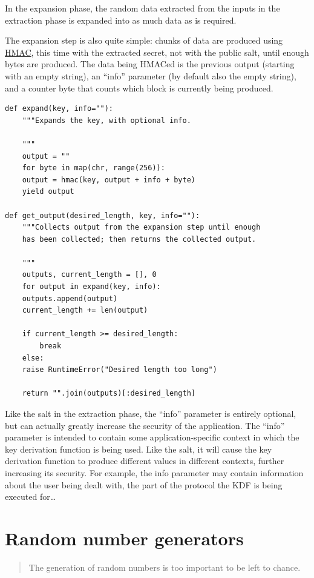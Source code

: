 \documentclass[11pt,ebook,table,dvipsnames]{memoir}
\begin{document}
In the expansion phase, the random data extracted from the inputs in
the extraction phase is expanded into as much data as is required.

The expansion step is also quite simple: chunks of data are produced
using \hyperref[HMAC]{HMAC}, this time with the extracted secret, not with the public
salt, until enough bytes are produced. The data being HMACed is the
previous output (starting with an empty string), an \enquote{info} parameter
(by default also the empty string), and a counter byte that counts
which block is currently being produced.

\begin{verbatim}
def expand(key, info=""):
    """Expands the key, with optional info.

    """
    output = ""
    for byte in map(chr, range(256)):
	output = hmac(key, output + info + byte)
	yield output

def get_output(desired_length, key, info=""):
    """Collects output from the expansion step until enough
    has been collected; then returns the collected output.

    """
    outputs, current_length = [], 0
    for output in expand(key, info):
	outputs.append(output)
	current_length += len(output)

	if current_length >= desired_length:
	    break
    else:
	raise RuntimeError("Desired length too long")

    return "".join(outputs)[:desired_length]
\end{verbatim}

Like the salt in the extraction phase, the \enquote{info} parameter is
entirely optional, but can actually greatly increase the security of
the application. The \enquote{info} parameter is intended to contain some
application-specific context in which the key derivation function is
being used. Like the salt, it will cause the key derivation function
to produce different values in different contexts, further increasing
its security. For example, the info parameter may contain information
about the user being dealt with, the part of the protocol the KDF is
being executed for\ldots{} \cite{rfc5869}
\chapter{Random number generators}
\label{sec-2-10}

\begin{quotation}
The generation of random numbers is too important to be left to chance.
\end{quotation}
\end{document}
